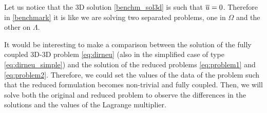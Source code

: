 \documentclass[r]{siamart171218}
\begin{document}
\begin{remark}
Let us notice that the 3D solution \eqref{benchm_sol3d} is such that $\overline{u}=0$. Therefore in \eqref{benchmark} it is like we are solving two separated problems, one in $\Omega$ and the other on $\Lambda$.
\end{remark}
\begin{remark}
It would be interesting to make a comparison between the solution of the fully coupled 3D-3D problem \eqref{eq:dirneu} (also in the simplified case of type \eqref{eq:dirneu_simple}) and the solution of the reduced problems \eqref{eq:problem1} and \eqref{eq:problem2}. 
Therefore, we could set the values of the data of the problem such that the reduced formulation becomes non-trivial and fully coupled.
Then, we will solve both the original and reduced problem to observe the differences in the solutions and the values of the Lagrange multiplier.
\end{remark}
%
%
\end{document}
